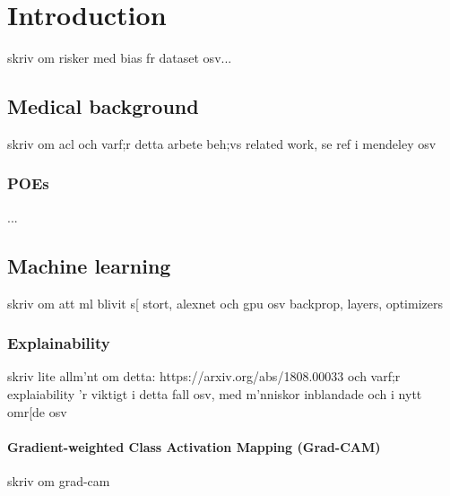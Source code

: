 \chapter{Introduction}



skriv om risker med bias fr dataset osv...

\section{Medical background}
skriv om acl och varf;r detta arbete beh;vs
related work, se ref i mendeley osv
\subsection{POEs}
...

\section{Machine learning} \label{sec:ML}
skriv om att ml blivit s[ stort, alexnet och gpu osv
backprop, layers, optimizers

\subsection{Explainability} \label{sec:explainability}
skriv lite allm'nt om detta: https://arxiv.org/abs/1808.00033
och varf;r explaiability 'r viktigt i detta fall osv, med m'nniskor inblandade och i nytt omr[de osv
\cite{Du2018}

\subsubsection{Gradient-weighted Class Activation Mapping (Grad-CAM)} \label{sec:grad-cam}


skriv om grad-cam


